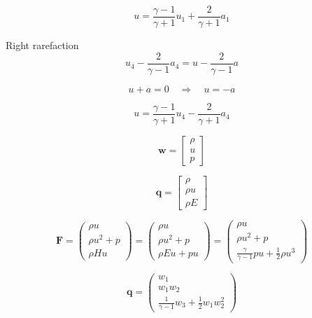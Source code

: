 \documentclass{article}
\begin{document}
\begin{equation}
u=\frac{\gamma-1}{\gamma+1}u_1+\frac{2}{\gamma+1}a_1
\end{equation}

Right rarefaction
\begin{equation}
u_4-\frac{2}{\gamma-1}a_4=u-\frac{2}{\gamma-1}a
\end{equation}

\begin{equation}
u+a=0 \quad \Rightarrow \quad u=-a
\end{equation}

\begin{equation}
u=\frac{\gamma-1}{\gamma+1}u_4-\frac{2}{\gamma+1}a_4
\end{equation}


\begin{equation}
\mathbf{w}=
\begin{bmatrix}
\rho\\
u\\
p
\end{bmatrix}
\end{equation}

\begin{equation}
\mathbf{q}=
\begin{bmatrix}
\rho\\
\rho u\\
\rho E
\end{bmatrix}
\end{equation}

\begin{equation}
\mathbf{F}=
\begin{pmatrix}
\rho u\\
\rho u^2+p\\
\rho Hu
\end{pmatrix}
=
\begin{pmatrix}
\rho u\\
\rho u^2+p\\
\rho Eu+pu
\end{pmatrix}
=
\begin{pmatrix}
\rho u\\
\rho u^2+p\\
\frac{\gamma}{\gamma-1}pu+\frac{1}{2}\rho u^3
\end{pmatrix}
\end{equation}

\begin{equation}
\mathbf{q}=
\begin{pmatrix}
w_1\\
w_1w_2\\
\frac{1}{\gamma-1}w_3+\frac{1}{2}w_1w_2^2
\end{pmatrix}
\end{equation}
\end{document}
